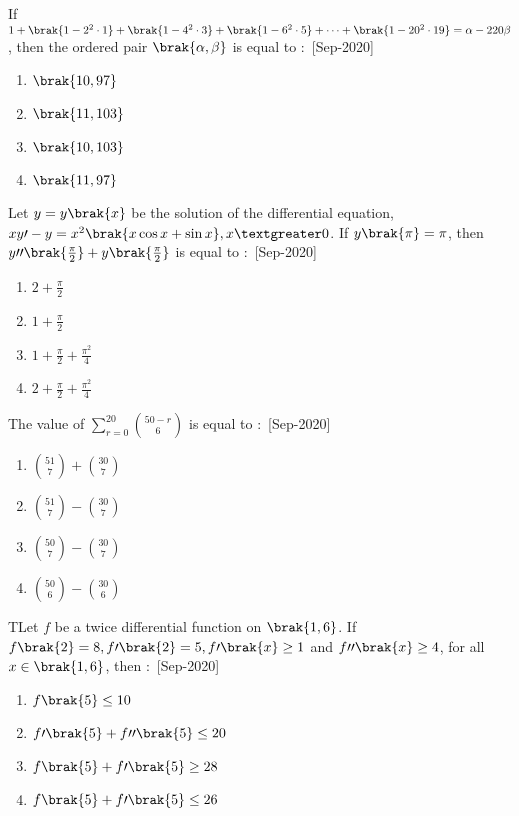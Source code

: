  \iffalse
    \title{2020}
    \author{EE24BTECH11021}
    \section{mcq-single}
\fi
 \item If $1+\brak{1-2^2\cdot1}+\brak{1-4^2\cdot3}+\brak{1-6^2\cdot5}+\dots +\brak{1-20^2\cdot 19}=\alpha-220\beta$, then the ordered pair $\brak{\alpha,\beta}$ is equal to $\colon$
    \hfill{[Sep-2020]}
        \begin{enumerate}
            \item $\brak{10,97}$
            \item $\brak{11,103}$
            \item $\brak{10,103}$
            \item $\brak{11,97}$
        \end{enumerate}
    \item Let $y=y\brak{x}$ be the solution of the differential equation, $xy\prime-y=x^2\brak{x\cos{x}+\sin{x}},x\textgreater 0$. If $y\brak{\pi}=\pi$, then $y\prime\prime\brak{\frac{\pi}{2}}+y\brak{\frac{\pi}{2}}$ is equal to $\colon$
    \hfill{[Sep-2020]}
        \begin{enumerate}
            \item $2+\frac{\pi}{2}$
            \item $1+\frac{\pi}{2}$
            \item $1+\frac{\pi}{2}+\frac{\pi^2}{4}$
            \item $2+\frac{\pi}{2}+\frac{\pi^2}{4}$
        \end{enumerate}
    \item The value of $\sum_{r=0}^{20}\binom{50-r}{6}$ is equal to $\colon$
    \hfill{[Sep-2020]}
        \begin{enumerate}
            \item $\binom{51}{7}+\binom{30}{7}$
            \item $\binom{51}{7}-\binom{30}{7}$
            \item $\binom{50}{7}-\binom{30}{7}$
            \item $\binom{50}{6}-\binom{30}{6}$
        \end{enumerate}
    \item TLet $f$ be a twice differential function on $\brak{1,6}$. If $f\brak{2}=8,f\prime\brak{2}=5,f\prime\brak{x}\geq 1$ and $f\prime\prime\brak{x}\geq 4$, for all $x\in \brak{1,6}$, then $\colon$
    \hfill{[Sep-2020]}
        \begin{enumerate}
            \item $f\brak{5}\leq 10$
            \item $f\prime\brak{5}+f\prime\prime\brak{5}\leq 20$
            \item $f\brak{5}+f\prime\brak{5}\geq 28$
            \item $f\brak{5}+f\prime\brak{5}\leq 26$
        \end{enumerate}
